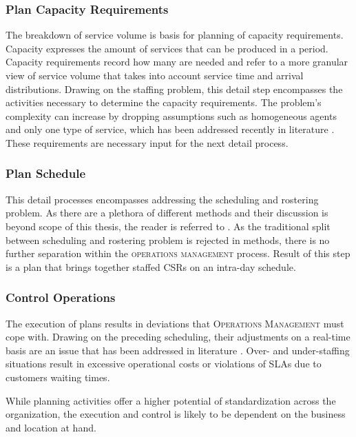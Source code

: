 	\subsubsection{Plan Capacity Requirements}
	The breakdown of service volume is basis for planning of capacity requirements. Capacity expresses the amount of services that can be produced in a period. Capacity requirements record how many  are needed and refer to a more granular view of service volume that takes into account service time and arrival distributions. 
	Drawing on the staffing problem, this detail step encompasses the activities necessary to determine the capacity requirements. The problem's complexity can increase by dropping assumptions such as homogeneous agents and only one type of service, which has been addressed recently in literature \citep[]{Aksin_2009}. These requirements are necessary input for the next detail process.
	
	\subsubsection{Plan Schedule}
	This detail processes encompasses addressing the scheduling and rostering problem. As there are a plethora of different methods and their discussion is beyond scope of this thesis, the reader is referred to  \citep[]{Aksin_2009}. As the traditional split between scheduling and rostering problem is rejected in methods, there is no further separation within the \textsc{operations management} process. Result of this step is a plan that brings together staffed \acrshort{CSR}s on an intra-day schedule.
	
	\subsubsection{Control Operations}
	The execution of plans results in deviations that \textsc{Operations Management} must cope with. Drawing on the preceding scheduling, their adjustments on a real-time basis are an issue that has been addressed in literature \citep{Hur_2009, Easton_2005, Mehrotra_2009}. Over- and under-staffing situations result in excessive operational costs or violations of \acrshort{SLA}s due to customers waiting times. 
	
	While planning activities offer a higher potential of standardization across the organization, the execution and control is likely to be dependent on the business and location at hand. 
	

